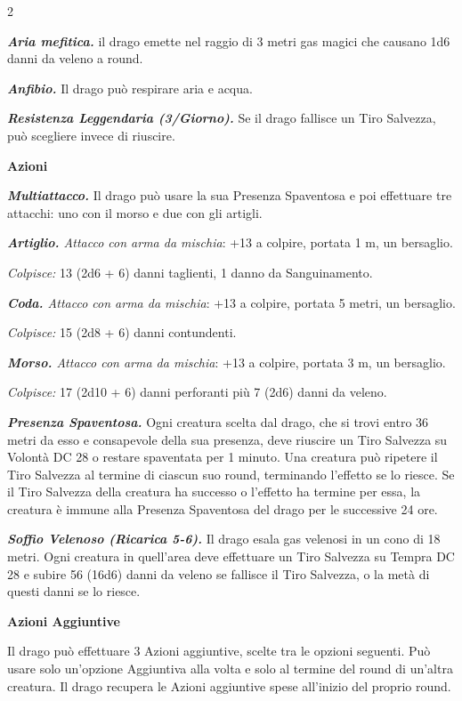 \begin{multicols}{2}
{\emph{\textbf{Aria mefitica.}} il drago emette nel raggio di 3 metri gas magici che causano 1d6 danni da veleno a round.

\emph{\textbf{Anfibio.}} Il drago può respirare aria e acqua.

\emph{\textbf{Resistenza Leggendaria (3/Giorno).}} Se il drago fallisce un Tiro Salvezza, può scegliere invece di riuscire.

\textbf{Azioni}

\emph{\textbf{Multiattacco.}} Il drago può usare la sua Presenza Spaventosa e poi effettuare tre attacchi: uno con il morso e due con gli artigli.

\emph{\textbf{Artiglio.} Attacco con arma da mischia}: +13 a colpire, portata 1 m, un bersaglio.

\emph{Colpisce:} 13 (2d6 + 6) danni taglienti, 1 danno da Sanguinamento.

\emph{\textbf{Coda.} Attacco con arma da mischia}: +13 a colpire, portata 5 metri, un bersaglio.

\emph{Colpisce:} 15 (2d8 + 6) danni contundenti.

\emph{\textbf{Morso.} Attacco con arma da mischia}: +13 a colpire, portata 3 m, un bersaglio.

\emph{Colpisce:} 17 (2d10 + 6) danni perforanti più 7 (2d6) danni da veleno.

\emph{\textbf{Presenza Spaventosa.}} Ogni creatura scelta dal drago, che si trovi entro 36 metri da esso e consapevole della sua presenza, deve riuscire un Tiro Salvezza su Volontà DC 28 o restare spaventata per 1 minuto. Una creatura può ripetere il Tiro Salvezza al termine di ciascun suo round, terminando l'effetto se lo riesce. Se il Tiro Salvezza della creatura ha successo o l'effetto ha termine per essa, la creatura è immune alla Presenza Spaventosa del drago per le successive 24 ore.

\emph{\textbf{Soffio Velenoso (Ricarica 5-6).}} Il drago esala gas velenosi in un cono di 18 metri. Ogni creatura in quell'area deve effettuare un Tiro Salvezza su Tempra DC 28 e subire 56 (16d6) danni da veleno se fallisce il Tiro Salvezza, o la metà di questi danni se lo riesce.

\textbf{Azioni Aggiuntive}

Il drago può effettuare 3 Azioni aggiuntive, scelte tra le opzioni seguenti. Può usare solo un'opzione Aggiuntiva alla volta e solo al termine del round di un'altra creatura. Il drago recupera le Azioni aggiuntive spese all'inizio del proprio round.

}
\end{multicols}
